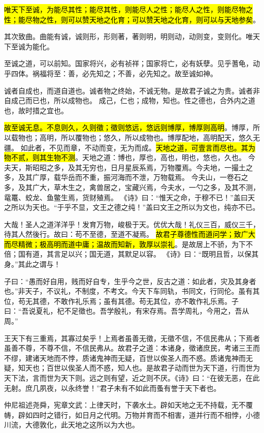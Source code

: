 \hl{唯天下至诚，为能尽其性；能尽其性，则能尽人之性；能尽人之性，则能尽物之性；能尽物之性，则可以赞天地之化育；可以赞天地之化育，则可以与天地参矣}。

其次致曲。曲能有诚，诚则形，形则著，著则明，明则动，动则变，变则化。唯天下至诚为能化。

至诚之道，可以前知。国家将兴，必有祯祥；国家将亡，必有妖孽。见乎蓍龟，动乎四体。祸福将至：善，必先知之；不善，必先知之。故至诚如神。

诚者自成也，而道自道也。诚者物之终始，不诚无物。是故君子诚之为贵。诚者非自成己而已也，所以成物也。
成己，仁也；成物，知也。性之德也，合外内之道也，故时措之宜也。

\hl{故至诚无息。不息则久，久则徵；徵则悠远，悠远则博厚，博厚则高明}。博厚，所以载物也；高明，所以覆物也；悠久，所以成物也。博厚配地，高明配天，悠久无疆。
如此者，不见而章，不动而变，无为而成。\hl{天地之道，可壹言而尽也。其为物不贰，则其生物不测}。天地之道：博也，厚也，高也，明也，悠也，久也。
今夫天，斯昭昭之多，及其无穷也，日月星辰系焉，万物覆焉。今夫地，一撮土之多，及其广厚，载华岳而不重，振河海而不泄，万物载焉。
今夫山，一卷石之多，及其广大，草木生之，禽兽居之，宝藏兴焉，今夫水，一勺之多，及其不测，鼋鼍、蛟龙、鱼鳖生焉，货财殖焉。
《诗》曰：“惟天之命，于穆不已！”盖曰天之所以为天也。“于乎不显，文王之德之纯！”盖曰文王之所以为文也，纯亦不已。

大哉！圣人之道洋洋乎！发育万物，峻极于天。优优大哉！礼仪三百，威仪三千，待其人然後行。故曰：苟不至德，至道不凝焉。
\hl{故君子尊德性而道问学；致广大而尽精微；极高明而道中庸；温故而知新，敦厚以崇礼}。是故居上不骄，为下不倍；国有道，其言足以兴；国无道，其默足以容。
《诗》曰：“既明且哲，以保其身。”其此之谓与！

子曰：“愚而好自用，贱而好自专，生乎今之世，反古之道：如此者，灾及其身者也。”非天子，不议礼，不制度，不考文。今天下车同轨，书同文，行同伦。虽有其位，苟无其德，不敢作礼乐焉；虽有其德。苟无其位，亦不敢作礼乐焉。子曰：“吾说夏礼，杞不足徵也。吾学殷礼，有宋存焉。吾学周礼，今用之，吾从周。”

王天下有三重焉，其寡过矣乎！上焉者虽善无徵，无徵不信，不信民弗从；下焉者虽善不尊，不尊不信，不信民弗从。故君子之道：本诸身，徵诸庶民，考诸三王而不缪，建诸天地而不悖，质诸鬼神而无疑，百世以俟圣人而不惑。质诸鬼神而无疑，知天也；百世以俟圣人而不惑，知人也。是故君子动而世为天下道，行而世为天下法，言而世为天下则。远之则有望，近之则不厌。《诗》曰：“在彼无恶，在此无射。庶几夙夜，以永终誉！”君子未有不如此而蚤有誉于天下者也。

仲尼祖述尧舜，宪章文武：上律天时，下袭水土。辟如天地之无不持载，无不覆帱，辟如四时之错行，如日月之代明。万物并育而不相害，道并行而不相悖，小德川流，大德敦化，此天地之这所以为大也。


